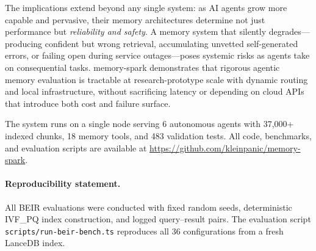 \documentclass[11pt]{article}
\begin{document}

The implications extend beyond any single system: as AI agents grow more capable and
pervasive, their memory architectures determine not just performance but \emph{reliability
and safety}. A memory system that silently degrades---producing confident but wrong
retrieval, accumulating unvetted self-generated errors, or failing open during service
outages---poses systemic risks as agents take on consequential tasks. memory-spark
demonstrates that rigorous agentic memory evaluation is tractable at research-prototype scale
with dynamic routing and local infrastructure, without sacrificing latency or depending on
cloud APIs that introduce both cost and failure surface.

The system runs on a single node serving 6 autonomous agents with 37,000+ indexed
chunks, 18 memory tools, and 483 validation tests. All code, benchmarks, and evaluation
scripts are available at \url{https://github.com/kleinpanic/memory-spark}.

\paragraph{Reproducibility statement.}
All BEIR evaluations were conducted with fixed random seeds, deterministic IVF\_PQ
index construction, and logged query--result pairs. The evaluation script
\texttt{scripts/run-beir-bench.ts} reproduces all 36 configurations from a fresh
LanceDB index.

\end{document}
